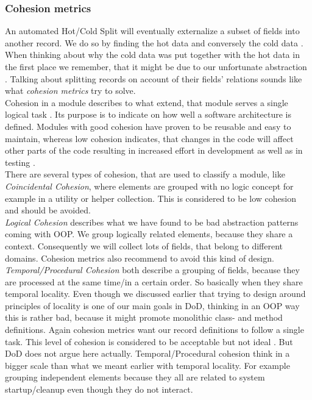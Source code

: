 \subsubsection{Cohesion metrics}
An automated Hot/Cold Split will eventually externalize a subset of fields into another record. We do so by finding the hot data and conversely the cold data . When thinking about why the cold data was put together with the hot data in the first place we remember, that it might be due to our unfortunate abstraction . Talking about splitting records on account of their fields' relations sounds like what \textit{cohesion metrics} try to solve.\\
Cohesion in a module describes to what extend, that module serves a single logical task . Its purpose is to indicate on how well a software architecture is defined. Modules with good cohesion have proven to be reusable and easy to maintain, whereas low cohesion indicates, that changes in the code will affect other parts of the code resulting in increased effort in development as well as in testing .\\
There are several types of cohesion, that are used to classify a module, like \textit{Coincidental Cohesion}, where elements are grouped with no logic concept for example in a utility or helper collection. This is considered to be low cohesion and should be avoided.\\
\textit{Logical Cohesion} describes what we have found to be bad abstraction patterns coming with OOP. We group logically related elements, because they share a context. Consequently we will collect lots of fields, that belong to different domains. Cohesion metrics also recommend to avoid this kind of design.\\
\textit{Temporal/Procedural Cohesion} both describe a grouping of fields, because they are processed at the same time/in a certain order. So basically when they share temporal locality. Even though we discussed earlier  that trying to design around principles of locality is one of our main goals in DoD, thinking in an OOP way this is rather bad, because it might promote monolithic class- and method definitions. Again cohesion metrics want our record definitions to follow a single task. This level of cohesion is considered to be acceptable but not ideal . But DoD does not argue here actually. Temporal/Procedural cohesion think in a bigger scale than what we meant earlier with temporal locality. For example grouping independent elements because they all are related to system startup/cleanup even though they do not interact.\\
